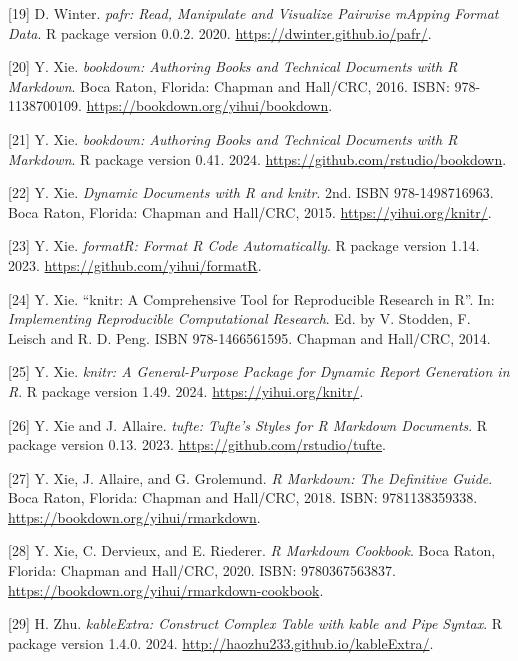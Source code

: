 \documentclass[
  12pt,
]{article}
\begin{document}
{[}19{]} D. Winter. \emph{pafr: Read, Manipulate and Visualize Pairwise mApping
Format Data}. R package version 0.0.2. 2020.
\url{https://dwinter.github.io/pafr/}.

{[}20{]} Y. Xie. \emph{bookdown: Authoring Books and Technical Documents with R
Markdown}. Boca Raton, Florida: Chapman and Hall/CRC, 2016. ISBN:
978-1138700109. \url{https://bookdown.org/yihui/bookdown}.

{[}21{]} Y. Xie. \emph{bookdown: Authoring Books and Technical Documents with R
Markdown}. R package version 0.41. 2024.
\url{https://github.com/rstudio/bookdown}.

{[}22{]} Y. Xie. \emph{Dynamic Documents with R and knitr}. 2nd. ISBN
978-1498716963. Boca Raton, Florida: Chapman and Hall/CRC, 2015.
\url{https://yihui.org/knitr/}.

{[}23{]} Y. Xie. \emph{formatR: Format R Code Automatically}. R package version
1.14. 2023. \url{https://github.com/yihui/formatR}.

{[}24{]} Y. Xie. ``knitr: A Comprehensive Tool for Reproducible Research in
R''. In: \emph{Implementing Reproducible Computational Research}. Ed. by V.
Stodden, F. Leisch and R. D. Peng. ISBN 978-1466561595. Chapman and
Hall/CRC, 2014.

{[}25{]} Y. Xie. \emph{knitr: A General-Purpose Package for Dynamic Report
Generation in R}. R package version 1.49. 2024.
\url{https://yihui.org/knitr/}.

{[}26{]} Y. Xie and J. Allaire. \emph{tufte: Tufte's Styles for R Markdown
Documents}. R package version 0.13. 2023.
\url{https://github.com/rstudio/tufte}.

{[}27{]} Y. Xie, J. Allaire, and G. Grolemund. \emph{R Markdown: The Definitive
Guide}. Boca Raton, Florida: Chapman and Hall/CRC, 2018. ISBN:
9781138359338. \url{https://bookdown.org/yihui/rmarkdown}.

{[}28{]} Y. Xie, C. Dervieux, and E. Riederer. \emph{R Markdown Cookbook}. Boca
Raton, Florida: Chapman and Hall/CRC, 2020. ISBN: 9780367563837.
\url{https://bookdown.org/yihui/rmarkdown-cookbook}.

{[}29{]} H. Zhu. \emph{kableExtra: Construct Complex Table with kable and Pipe
Syntax}. R package version 1.4.0. 2024.
\url{http://haozhu233.github.io/kableExtra/}.
\end{document}
